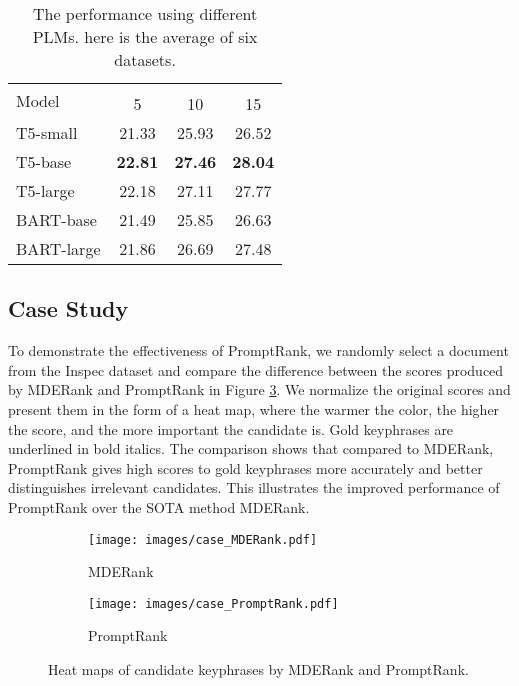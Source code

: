 \documentclass[11pt]{article}
\begin{document}
\begin{table}
\centering
{}
\begin{tabular}{lccc} 
\toprule
\multirow{2}{*}{Model} & \multicolumn{3}{c}{}  \\ 
\cline{2-4}
                       & 5     & 10    & 15        \\ 
\midrule
T5-small               & 21.33 & 25.93 & 26.52     \\
T5-base                & \textbf{22.81} & \textbf{27.46} & \textbf{28.04}     \\
T5-large               & 22.18 & 27.11 & 27.77     \\
BART-base              & 21.49 & 25.85 & 26.63     \\
BART-large             & 21.86 & 26.69 & 27.48     \\
\bottomrule
\end{tabular}
\caption{The performance using different PLMs.  here is the average of six datasets.}
\label{tb: model}
\end{table}





\subsection{Case Study}


To demonstrate the effectiveness of PromptRank, we randomly select a document from the Inspec dataset and compare the difference between the scores produced by MDERank and PromptRank in Figure \ref{fg: case}. We normalize the original scores and present them in the form of a heat map, where the warmer the color, the higher the score, and the more important the candidate is. Gold keyphrases are underlined in bold italics. The comparison shows that compared to MDERank, PromptRank gives high scores to gold keyphrases more accurately and better distinguishes irrelevant candidates. This illustrates the improved performance of PromptRank over the SOTA method MDERank.

\begin{figure}[ht]
     \centering
     \begin{subfigure}[b]{0.48\textwidth}
         \centering
         \texttt{[image: images/case\_MDERank.pdf]}
         \caption{MDERank}
         \label{fig:y equals x}
     \end{subfigure}
    
     \begin{subfigure}[b]{0.48\textwidth}
         \centering
         \texttt{[image: images/case\_PromptRank.pdf]}
         \caption{PromptRank}
         \label{fig:three sin x}
     \end{subfigure}
            \caption{Heat maps of candidate keyphrases by MDERank and PromptRank.}
        \label{fg: case}
\end{figure}
\end{document}
